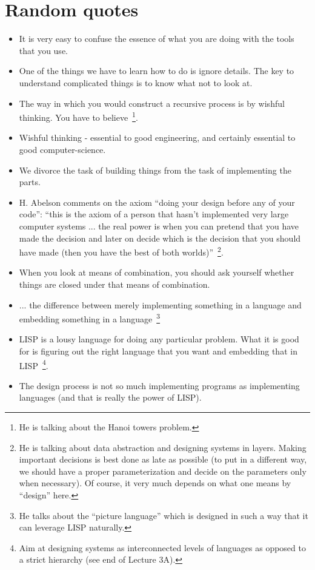 \documentclass[12pt,a4paper]{article}
\begin{document}
\appendix
\appendixpage

\section{Random quotes}

\begin{itemize}
\item It is very easy to confuse the essence of what you are doing with the tools that
  you use.
\item One of the things we have to learn how to do is ignore details. The key to
  understand complicated things is to know what not to look at.
\item The way in which you would construct a recursive process is by wishful thinking.
  You have to believe~\footnote{He is talking about the Hanoi towers problem.}.
\item Wishful thinking - essential to good engineering, and certainly essential to good
  computer-science.
\item We divorce the task of building things from the task of implementing the parts.
\item H. Abelson comments on the axiom ``doing your design before any of your code'':
  ``this is the axiom of a person that hasn't implemented very large computer systems
  ... the real power is when you can pretend that you have made the decision and later
  on decide which is the decision that you should have made (then you have the best of
  both worlds)''~\footnote{He is talking about data abstraction and designing systems in
  layers. Making important decisions is best done as late as possible (to put in a
  different way, we should have a proper parameterization and decide on the parameters
  only when necessary). Of course, it very much depends on what one means by ``design''
  here.}.
\item When you look at means of combination, you should ask yourself whether things are
  closed under that means of combination.
\item ... the difference between merely implementing something in a language and
  embedding something in a language~\footnote{He talks about the ``picture language''
  which is designed in such a way that it can leverage LISP naturally.}
\item LISP is a lousy language for doing any particular problem. What it is good for is
  figuring out the right language that you want and embedding that in LISP~\footnote{Aim
  at designing systems as interconnected levels of languages as opposed to a strict
  hierarchy (see end of Lecture 3A).}.
\item The design process is not so much implementing programs as implementing languages
  (and that is really the power of LISP).
\end{itemize}

\nocite{*}


\end{document}
